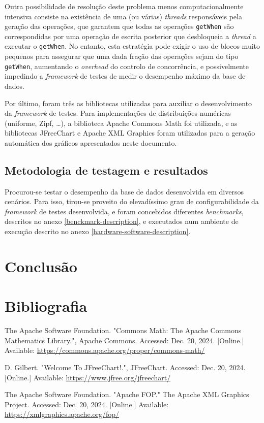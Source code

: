 \documentclass[11pt, a4paper]{article}
\begin{document}
Outra possibilidade de resolução deste problema menos computacionalmente intensiva consiste na
existência de uma (ou várias) \emph{threads} responsáveis pela geração das operações, que garantem
que todas as operações \texttt{getWhen} são correspondidas por uma operação de escrita posterior que
desbloqueia a \emph{thread} a executar o \texttt{getWhen}. No entanto, esta estratégia pode exigir o
uso de blocos muito pequenos para assegurar que uma dada fração das operações sejam do tipo
\texttt{getWhen}, aumentando o \emph{overhead} do controlo de concorrência, e possivelmente
impedindo a \emph{framework} de testes de medir o desempenho máximo da base de dados.

Por último, foram três as bibliotecas utilizadas para auxiliar o desenvolvimento da \emph{framework}
de testes. Para implementações de distribuições numéricas (uniforme, Zipf, \ldots), a biblioteca
Apache Commons Math \cite{apache-commons-math} foi utilizada, e as bibliotecas JFreeChart
\cite{jfreechart} e Apache XML Graphics \cite{apache-xml-graphics} foram utilizadas para a geração
automática dos gráficos apresentados neste documento.

\subsection{Metodologia de testagem e resultados}

Procurou-se testar o desempenho da base de dados desenvolvida em diversos cenários. Para isso,
tirou-se proveito do elevadíssimo grau de configurabilidade da \emph{framework} de testes
desenvolvida, e foram concebidos diferentes \emph{benchmarks}, descritos no anexo
\ref{benckmark-description}, e executados num ambiente de execução descrito no anexo
\ref{hardware-software-description}.

\section{Conclusão}

\section{Bibliografia}
\def\refname{}
\vspace{-1.5cm}
\begin{thebibliography}{9}
        The Apache Software Foundation. "Commons Math: The Apache Commons Mathematics Library."{},
        Apache Commons. Accessed: Dec. 20, 2024. [Online.] Available:
        \url{https://commons.apache.org/proper/commons-math/}

        D. Gilbert. "Welcome To JFreeChart!."{}, JFreeChart. Accessed: Dec. 20, 2024. [Online.]
        Available: \url{https://www.jfree.org/jfreechart/}

        The Apache Software Foundation. "Apache FOP."{} The Apache XML Graphics Project. Accessed:
        Dec. 20, 2024. [Online.] Available: \url{https://xmlgraphics.apache.org/fop/}
\end{thebibliography}
\end{document}
